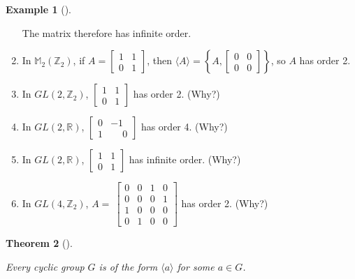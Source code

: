 \documentclass[10pt,]{book}
\theoremstyle{plain}
\newtheorem{theorem}{Theorem}[section]
\theoremstyle{definition}
\theoremstyle{definition}
\theoremstyle{definition}
\newtheorem{example}[theorem]{Example}
\theoremstyle{definition}
\numberwithin{equation}{section}
\def\Z{\mathbb{Z}}
\def\R{\mathbb{R}}
\def\M{\mathbb{M}}
\newcommand{\amp}{ & }
\begin{document}
\begin{example}[]
\begin{enumerate}
            The matrix therefore has infinite order.
\item\hypertarget{li-252}{}
            In \(\M_2(\Z_2)\), if \(A=
            \begin{bmatrix}
            1 \amp  1 \\
            0 \amp  1
            \end{bmatrix} 
           \), then \(\langle A\rangle =\left\{A, \begin{bmatrix}0\amp 0 \\ 0\amp 0\end{bmatrix}\right\}\), so \(A\) has order 2.
\item\hypertarget{li-253}{}
            In \(GL(2,\Z_2)\), \(
            \begin{bmatrix}
            1 \amp  1 \\
            0 \amp  1
            \end{bmatrix} 
            \) has order 2. (Why?)
\item\hypertarget{li-254}{}
            In \(GL(2,\R)\), \(

            \begin{bmatrix}            
            0 \amp  -1 \\
            1 \amp  \phantom{-}0
            \end{bmatrix} 
           \) has order 4. (Why?)
\item\hypertarget{li-255}{}
            In \(GL(2,\R)\), \(
            \begin{bmatrix}
            1 \amp  1 \\
            0 \amp  1
            \end{bmatrix} 
           \) has infinite order. (Why?)
\item\hypertarget{li-256}{}
            In \(GL(4,\Z_2)\),
            \(A=\
            \begin{bmatrix}
            0 \amp  0 \amp  1 \amp  0 \\
            0 \amp  0 \amp  0 \amp  1 \\
            1 \amp  0 \amp  0 \amp  0 \\
            0 \amp  1 \amp  0 \amp  0
            \end{bmatrix} 
            \) has order 2. (Why?)
\end{enumerate}
\end{example}
\begin{theorem}[{}]\label{theorem-24}

        Every cyclic group \(G\) is of the form \(\langle a\rangle\) for some \(a\in G\).
\end{theorem}
\end{document}
